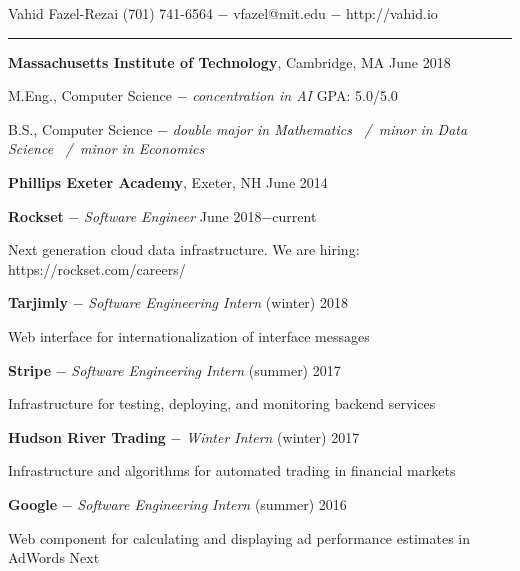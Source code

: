 \documentclass[11pt]{article}
\newcommand{\msection}[1]{\vspace{1em}\marginnote{#1}} %
\newcommand{\bt}[1]{\textbf{#1}} %
\newcommand{\gap}[0]{\vspace{0.8em}} %
\newcommand{\dash}[0]{ $-$ } %
\newcommand{\tabsep}[0]{\, / \,} %
\begin{document}

{\Huge Vahid Fazel-Rezai} \hfill  (701) 741-6564\dash vfazel@mit.edu\dash http://vahid.io

\vspace{0.4em}

\hspace{-1.2in}\rule{7.9in}{0.2em}

\vspace{-0.2em}



\msection{Education}

\bt{Massachusetts Institute of Technology}, Cambridge, MA \hfill June 2018

M.Eng., Computer Science \dash \emph{concentration in AI} \hfill GPA: 5.0/5.0

B.S., Computer Science \dash \emph{double major in Mathematics \tabsep minor in Data Science \tabsep minor in Economics}

\gap

\bt{Phillips Exeter Academy}, Exeter, NH \hfill June 2014



\msection{Work}

\bt{Rockset}\dash \emph{Software Engineer} \hfill June 2018$-$current

Next generation cloud data infrastructure. We are hiring: https://rockset.com/careers/

\gap

\bt{Tarjimly}\dash \emph{Software Engineering Intern} \hfill (winter) 2018

Web interface for internationalization of interface messages

\gap

\bt{Stripe}\dash \emph{Software Engineering Intern} \hfill (summer) 2017

Infrastructure for testing, deploying, and monitoring backend services

\gap

\bt{Hudson River Trading}\dash \emph{Winter Intern} \hfill (winter) 2017

Infrastructure and algorithms for automated trading in financial markets

\gap

\bt{Google}\dash \emph{Software Engineering Intern} \hfill (summer) 2016

Web component for calculating and displaying ad performance estimates in AdWords Next
\end{document}
